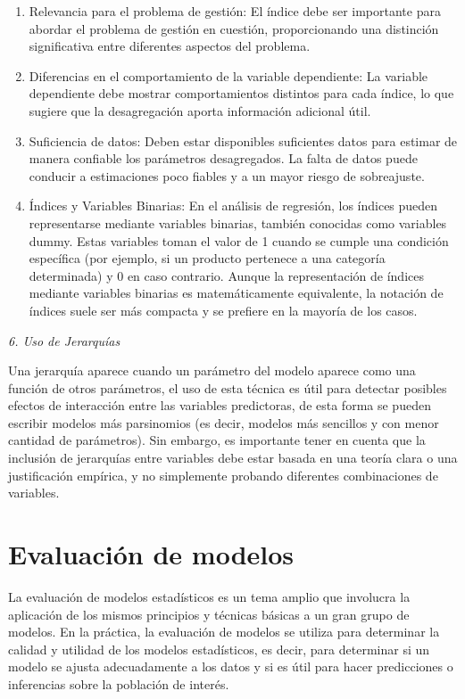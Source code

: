 \documentclass[
]{book}
\begin{document}
\begin{enumerate}
\def\labelenumi{\alph{enumi})}
\item
  Relevancia para el problema de gestión: El índice debe ser
  importante para abordar el problema de gestión en cuestión,
  proporcionando una distinción significativa entre diferentes
  aspectos del problema.
\item
  Diferencias en el comportamiento de la variable dependiente: La
  variable dependiente debe mostrar comportamientos distintos para
  cada índice, lo que sugiere que la desagregación aporta información
  adicional útil.
\item
  Suficiencia de datos: Deben estar disponibles suficientes datos para
  estimar de manera confiable los parámetros desagregados. La falta de
  datos puede conducir a estimaciones poco fiables y a un mayor riesgo
  de sobreajuste.
\item
  Índices y Variables Binarias: En el análisis de regresión, los
  índices pueden representarse mediante variables binarias, también
  conocidas como variables dummy. Estas variables toman el valor de 1
  cuando se cumple una condición específica (por ejemplo, si un
  producto pertenece a una categoría determinada) y 0 en caso
  contrario. Aunque la representación de índices mediante variables
  binarias es matemáticamente equivalente, la notación de índices
  suele ser más compacta y se prefiere en la mayoría de los casos.
\end{enumerate}

\emph{6. Uso de Jerarquías}

Una jerarquía aparece cuando un parámetro del modelo aparece como una
función de otros parámetros, el uso de esta técnica es útil para
detectar posibles efectos de interacción entre las variables
predictoras, de esta forma se pueden escribir modelos más parsinomios
(es decir, modelos más sencillos y con menor cantidad de parámetros).
Sin embargo, es importante tener en cuenta que la inclusión de
jerarquías entre variables debe estar basada en una teoría clara o una
justificación empírica, y no simplemente probando diferentes
combinaciones de variables.

\hypertarget{evaluaciuxf3n-de-modelos}{%
\section{Evaluación de modelos}\label{evaluaciuxf3n-de-modelos}}

La evaluación de modelos estadísticos es un tema amplio que involucra la
aplicación de los mismos principios y técnicas básicas a un gran grupo
de modelos. En la práctica, la evaluación de modelos se utiliza para
determinar la calidad y utilidad de los modelos estadísticos, es decir,
para determinar si un modelo se ajusta adecuadamente a los datos y si es
útil para hacer predicciones o inferencias sobre la población de
interés.
\end{document}
